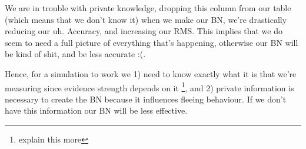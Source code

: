 We are in trouble with private knowledge, dropping this column from our table (which means that we don't know it) when we make our BN, we're drastically reducing our uh. Accuracy, and increasing our RMS. This implies that we do seem to need a full picture of everything that's happening, otherwise our BN will be kind of shit, and be less accurate :(.

Hence, for a simulation to work we 1) need to know exactly what it is that we're measuring since evidence strength depends on it \footnote{explain this more}, and 2) private information is necessary to create the BN because it influences fleeing behaviour. If we don't have this information our BN will be less effective.


